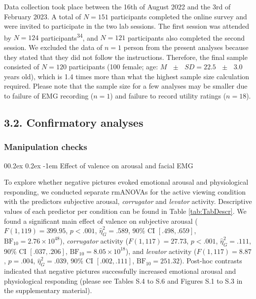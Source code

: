 \documentclass[
  man,floatsintext]{apa6}
\makeatletter
\let\oldparagraph\paragraph
\renewcommand{\paragraph}[1]{\oldparagraph{#1}\mbox{}}
\renewcommand{\paragraph}{\@startsection{paragraph}{4}{\parindent}%
  {0\baselineskip \@plus 0.2ex \@minus 0.2ex}%
  {-1em}%
  {\normalfont\normalsize\bfseries\itshape\typesectitle}}
\makeatother
\begin{document}
Data collection took place between the 16th of August 2022 and the 3rd of February 2023.
A total of \(N=151\) participants completed the online survey and were invited to participate in the two lab sessions.
The first session was attended by \(N=124\) participants\textsuperscript{34}, and \(N=121\) participants also completed the second session.
We excluded the data of \(n=1\) person from the present analyses because they stated that they did not follow the instructions.
Therefore, the final sample consisted of \(N=120\) participants (100 female; age: \(M\text{ }\pm\text{ }SD =22.5\text{ }\pm\text{ }3.0\) years old), which is 1.4 times more than what the highest sample size calculation required.
Please note that the sample size for a few analyses may be smaller due to failure of EMG recording (\(n=1\)) and failure to record utility ratings (\(n=18\)).

\hypertarget{confirmatory-analyses}{%
\subsection{3.2. Confirmatory analyses}\label{confirmatory-analyses}}

\hypertarget{manipulation-checks}{%
\subsubsection{Manipulation checks}\label{manipulation-checks}}

\hypertarget{effect-of-valence-on-arousal-and-facial-emg}{%
\paragraph{Effect of valence on arousal and facial EMG}\label{effect-of-valence-on-arousal-and-facial-emg}}

To explore whether negative pictures evoked emotional arousal and physiological responding, we conducted separate rmANOVAs for the active viewing condition with the predictors subjective arousal, \emph{corrugator} and \emph{levator} activity.
Descriptive values of each predictor per condition can be found in Table \ref{tab:TabDescr}.
We found a significant main effect of valence on subjective arousal (\(F(1, 119) = 399.95\), \(p < .001\), \(\hat{\eta}^2_G = .589\), 90\% CI \([.498, .659]\), \(\mathrm{BF}_{\textrm{10}} = 2.76 \times 10^{48}\)), \emph{corrugator} activity (\(F(1, 117) = 27.73\), \(p < .001\), \(\hat{\eta}^2_G = .111\), 90\% CI \([.037, .206]\), \(\mathrm{BF}_{\textrm{10}} = 8.05 \times 10^{18}\)), and \emph{levator} activity (\(F(1, 117) = 8.87\), \(p = .004\), \(\hat{\eta}^2_G = .039\), 90\% CI \([.002, .111]\), \(\mathrm{BF}_{\textrm{10}} = 251.32\)).
Post-hoc contrasts indicated that negative pictures successfully increased emotional arousal and physiological responding (please see Tables S.4 to S.6 and Figures S.1 to S.3 in the supplementary material).
\end{document}
